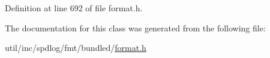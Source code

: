 Definition at line 692 of file format.\+h.



The documentation for this class was generated from the following file\+:\begin{DoxyCompactItemize}
\item 
util/inc/spdlog/fmt/bundled/\hyperlink{format_8h}{format.\+h}\end{DoxyCompactItemize}
